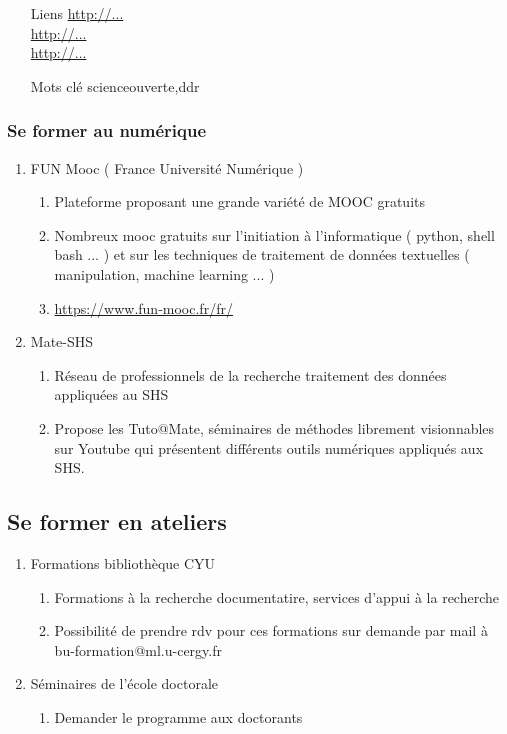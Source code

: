\documentclass{book}
\begin{document}
\begin{enumerate}
\begin{itemize}
    \item [Liens]
        \url{http://...}\\
        \url{http://...}\\
        \url{http://...}\\
    \item [Mots clé]
        \gls{scienceouverte},\gls{ddr}
\end{itemize}
\end{enumerate}

\subsubsection{Se former au numérique}

\begin{enumerate}
	\item FUN Mooc ( France Université Numérique )
        \begin{enumerate}
            \item Plateforme proposant une grande variété de MOOC gratuits
            \item Nombreux mooc gratuits sur l'initiation à l'informatique ( python, shell bash ... ) et sur les techniques de traitement de données textuelles ( manipulation, machine learning ... )
            \item \url{https://www.fun-mooc.fr/fr/}
        \end{enumerate}  
    \item Mate-SHS
        \begin{enumerate}
            \item Réseau de professionnels de la recherche traitement des données appliquées au SHS
            \item Propose les Tuto@Mate, séminaires de méthodes librement visionnables sur Youtube qui présentent différents outils numériques appliqués aux SHS.
        \end{enumerate}
\end{enumerate}

\subsection{Se former en ateliers}

\begin{enumerate}
	\item Formations bibliothèque CYU
        \begin{enumerate}
            \item Formations à la recherche documentatire, services d'appui à la recherche
            \item Possibilité de prendre rdv pour ces formations sur demande par mail à bu-formation@ml.u-cergy.fr
        \end{enumerate}
	\item Séminaires de l'école doctorale
        \begin{enumerate}
            \item Demander le programme aux doctorants
        \end{enumerate}
\end{enumerate}
\end{document}
